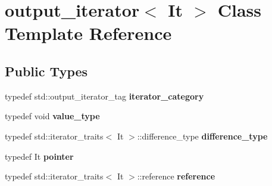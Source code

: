 \hypertarget{classoutput__iterator}{}\section{output\+\_\+iterator$<$ It $>$ Class Template Reference}
\label{classoutput__iterator}
\subsection*{Public Types}
\begin{DoxyCompactItemize}
\item 
\mbox{\label{classoutput__iterator_a8f249d1b15ec5e75784a2bded0b9c975}} 
typedef std\+::output\+\_\+iterator\+\_\+tag {\bfseries iterator\+\_\+category}
\item 
\mbox{\label{classoutput__iterator_aac7006871e6a66ca63a32385cc190193}} 
typedef void {\bfseries value\+\_\+type}
\item 
\mbox{\label{classoutput__iterator_ae653b04720b5f01007e8a3fae281782f}} 
typedef std\+::iterator\+\_\+traits$<$ It $>$\+::difference\+\_\+type {\bfseries difference\+\_\+type}
\item 
\mbox{\label{classoutput__iterator_a3c8a67da8d8511dbde116d72cac9d6af}} 
typedef It {\bfseries pointer}
\item 
\mbox{\label{classoutput__iterator_a737c24428dcc142ce7938e53af600439}} 
typedef std\+::iterator\+\_\+traits$<$ It $>$\+::reference {\bfseries reference}
\end{DoxyCompactItemize}
